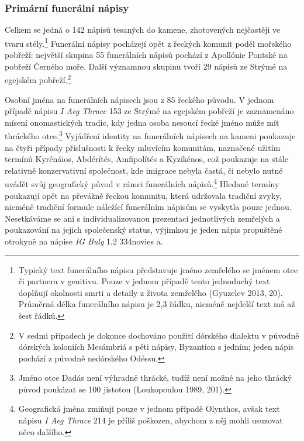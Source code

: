 \subsubsection[primární-funerální-nápisy-1]{Primární funerální nápisy}

Celkem se jedná o 142 nápisů tesaných do kamene, zhotovených nejčastěji ve tvaru stély.\footnote{Typický text funerálního nápisu představuje jméno zemřelého se jménem otce či partnera v genitivu. Pouze v jednom případě tento jednoduchý text doplňují okolnosti smrti a detaily z života zemřelého (Gyuzelev 2013, 20). Průměrná délka funerálního nápisu je 2,3 řádku, nicméně nejdelší text má až šest řádků.} Funerální nápisy pocházejí opět z řeckých komunit podél mořského pobřeží: největší skupina 55 funerálních nápisů pochází z Apollónie Pontské na pobřeží Černého moře. Další významnou skupinu tvoří 29 nápisů ze Strýmé na egejském pobřeží.\footnote{V sedmi případech je dokonce dochováno použití dórského dialektu v původně dórských koloniích Mesámbriá s pěti nápisy, Byzantion s jedním; jeden nápis pochází z původně nedórského Odéssu.}

Osobní jména na funerálních nápisech jsou z 85  řeckého původu. V jednom případě nápisu {\em I Aeg Thrace} 153 ze Strýmé na egejském pobřeží je zaznamenáno mísení onomastických tradic, kdy jedna osoba nesoucí řecké jméno může mít thráckého otce.\footnote{Jméno otce Dadás není výhradně thrácké, tudíž není možné na jeho thrácký původ poukázat se 100  jistotou (Loukopoulou 1989, 201).} Vyjádření identity na funerálních nápisech na kameni poukazuje na čtyři případy příslušnosti k řecky mluvícím komunitám, naznačené užitím termínů Kyrénáios, Abdérítés, Amfipolítés a Kyzikénos, což poukazuje na stále relativně konzervativní společnost, kde imigrace nebyla častá, či nebylo nutné uvádět svůj geografický původ v rámci funerálních nápisů.\footnote{Geografická jména zmiňují pouze v jednom případě Olynthos, avšak text nápisu {\em I Aeg Thrace} 214 je příliš poškozen, abychom z něj mohli usuzovat něco dalšího.} Hledané termíny poukazují opět na převážně řeckou komunitu, která udržovala tradiční zvyky, nicméně tradiční formule náležící funerálním nápisům se vyskytla pouze jednou. Nesetkáváme se ani s individualizovanou prezentací jednotlivých zemřelých a poukazování na jejich společenský status, výjimkou je jeden nápis propuštěné otrokyně na nápise {\em IG Bulg} 1,2 334novies a.

